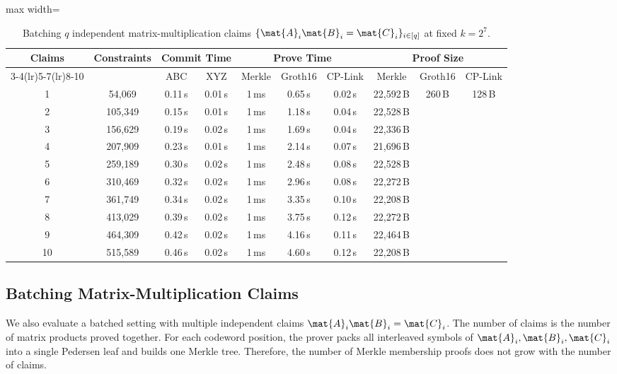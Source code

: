 \begin{table}[!t]
\centering
\scriptsize
\setlength{\tabcolsep}{2.4pt}
\begin{adjustbox}{max width=\textwidth}
\begin{tabular}{c c cc ccc ccc}
\toprule
\multirow{2}{*}{\textbf{Claims}}
& \multirow{2}{*}{\textbf{Constraints}}
& \multicolumn{2}{c}{\textbf{Commit Time}}
& \multicolumn{3}{c}{\textbf{Prove Time}}
& \multicolumn{3}{c}{\textbf{Proof Size}} \\
\cmidrule(lr){3-4}\cmidrule(lr){5-7}\cmidrule(lr){8-10}
& & ABC & XYZ
& Merkle & Groth16 & CP-Link
& Merkle & Groth16 & CP-Link \\
\midrule
1  & 54{,}069  & 0.11\,s & 0.01\,s & 1\,ms & 0.65\,s & 0.02\,s & 22{,}592\,B & \multirow{10}{*}{260\,B} & \multirow{10}{*}{128\,B} \\
2  & 105{,}349 & 0.15\,s & 0.01\,s & 1\,ms & 1.18\,s & 0.04\,s & 22{,}528\,B & & \\
3  & 156{,}629 & 0.19\,s & 0.02\,s & 1\,ms & 1.69\,s & 0.04\,s & 22{,}336\,B & & \\
4  & 207{,}909 & 0.23\,s & 0.01\,s & 1\,ms & 2.14\,s & 0.07\,s & 21{,}696\,B & & \\
5  & 259{,}189 & 0.30\,s & 0.02\,s & 1\,ms & 2.48\,s & 0.08\,s & 22{,}528\,B & & \\
6  & 310{,}469 & 0.32\,s & 0.02\,s & 1\,ms & 2.96\,s & 0.08\,s & 22{,}272\,B & & \\
7  & 361{,}749 & 0.34\,s & 0.02\,s & 1\,ms & 3.35\,s & 0.10\,s & 22{,}208\,B & & \\
8  & 413{,}029 & 0.39\,s & 0.02\,s & 1\,ms & 3.75\,s & 0.12\,s & 22{,}272\,B & & \\
9  & 464{,}309 & 0.42\,s & 0.02\,s & 1\,ms & 4.16\,s & 0.11\,s & 22{,}464\,B & & \\
10 & 515{,}589 & 0.46\,s & 0.02\,s & 1\,ms & 4.60\,s & 0.12\,s & 22{,}208\,B & & \\
\bottomrule
\end{tabular}
\end{adjustbox}
\vspace{6pt}
\caption{Batching \(q\) independent matrix-multiplication claims
\(\{\mat{A}_i\mat{B}_i=\mat{C}_i\}_{i\in[q]}\) at fixed \(k=2^7\).}
\label{tab:lamp-batch}
\end{table}

\subsection{Batching Matrix-Multiplication Claims}
\label{sec:eval-batch}
We also evaluate a batched setting with multiple independent claims \(\mat{A}_i\mat{B}_i=\mat{C}_i\).  The number of claims is the number of matrix products proved together.  For each codeword position, the prover packs all interleaved symbols of \(\mat{A}_i,\mat{B}_i,\mat{C}_i\) into a single Pedersen leaf and builds one Merkle tree.  Therefore, the number of Merkle membership proofs does not grow with the number of claims.

